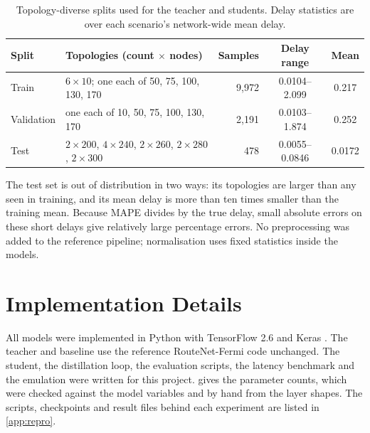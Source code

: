 \begin{table}[ht]
\centering
\small
\caption{Topology-diverse splits used for the teacher and students. Delay statistics are over each scenario's network-wide mean delay.}
\label{tab:v1-split}
\begin{tabularx}{\textwidth}{@{}l Y r c c@{}}
\toprule
\textbf{Split} & \textbf{Topologies (count $\times$ nodes)} & \textbf{Samples} & \textbf{Delay range} & \textbf{Mean} \\
\midrule
Train      & $6\times10$; one each of 50, 75, 100, 130, 170 & 9,972 & 0.0104--2.099 & 0.217 \\
Validation & one each of 10, 50, 75, 100, 130, 170          & 2,191 & 0.0103--1.874 & 0.252 \\
Test       & $2\times200$, $4\times240$, $2\times260$, $2\times280$, $2\times300$ & 478 & 0.0055--0.0846 & 0.0172 \\
\bottomrule
\end{tabularx}
\end{table}

The test set is out of distribution in two ways: its topologies are larger than any seen in training, and its mean delay is more than ten times smaller than the training mean. Because MAPE divides by the true delay, small absolute errors on these short delays give relatively large percentage errors. No preprocessing was added to the reference pipeline; normalisation uses fixed statistics inside the models.

\section{Implementation Details}
\label{sec:impl}

All models were implemented in Python with TensorFlow 2.6 and Keras \cite{abadi2016tensorflow}. The teacher and baseline use the reference RouteNet-Fermi code \cite{routenetfermicode} unchanged. The student, the distillation loop, the evaluation scripts, the latency benchmark and the emulation were written for this project.  gives the parameter counts, which were checked against the model variables and by hand from the layer shapes. The scripts, checkpoints and result files behind each experiment are listed in \cref{app:repro}.

